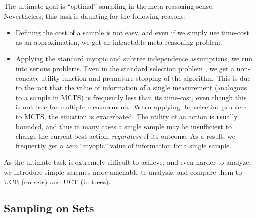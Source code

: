\documentclass{article}
\begin{document}
The ultimate goal is ``optimal'' sampling in the meta-reasoning
sense. Nevertheless, this task is daunting for the following reasons:
\begin{itemize}
\item Defining the cost of a sample is not easy, and even if we simply
  use time-cost as an approximation, we get an intractable
  meta-reasoning problem.
\item Applying the standard myopic and subtree independence
  assumptions, we run into serious problems. Even in the standard
  selection problem \cite{TolpinShimony.blinkered}, we get a
  non-concave utility function and premature stopping of the
  algorithm. This is due to the fact that the value of information of
  a single measurement (analogous to a sample in MCTS) is frequently
  less than its time-cost, even though this is not true for multiple
  measurements.  When applying the selection problem to MCTS, the
  situation is exacerbated.  The utility of an action is usually
  bounded, and thus in many cases a single sample may be insufficient
  to change the current best action, {\em regardless} of its
  outcome. As a result, we frequently get a {\em zero} ``myopic''
  value of information for a single sample.
\end{itemize}

As the ultimate task is extremely difficult
to achieve, and even harder to analyze, we introduce
simple schemes more amenable to analysis, and compare
them to UCB (on sets) and UCT (in trees).

\subsection{Sampling on Sets}
\label{sec:sampling-on-sets}
\end{document}
